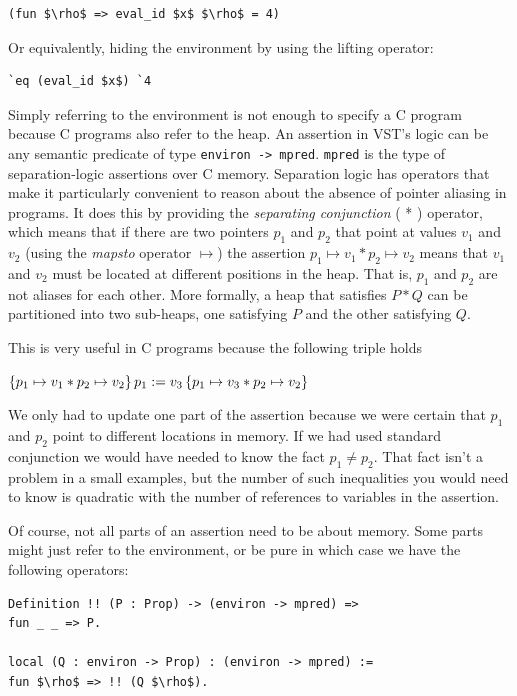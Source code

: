 \documentclass{puthesis}
\begin{document}
\begin{lstlisting}
(fun $\rho$ => eval_id $x$ $\rho$ = 4)
\end{lstlisting}

Or equivalently, hiding the environment by using the lifting operator:

\begin{lstlisting}
`eq (eval_id $x$) `4
\end{lstlisting}

Simply referring to the environment is not enough to specify a C
program because C programs also refer to the heap. An assertion in
VST's logic can be any semantic predicate of type 
\lstinline|environ -> mpred|.  \lstinline|mpred| is the type of separation-logic
assertions over C memory. Separation logic has operators that make it
particularly convenient to reason about the absence of pointer
aliasing in programs. It does this by providing the 
\emph{separating conjunction} ( * ) operator, which means that if there are two
pointers $p_1$ and $p_2$ that point at values $v_1$ and $v_2$ (using
the \emph{mapsto} operator $\mapsto$) the assertion
$p_1 \mapsto v_1 * p_2 \mapsto v_2$ means that $v_1$ and $v_2$ must be
located at different positions in the heap. That is,
$p_1$ and $p_2$ are not aliases for each other. More
formally, a heap that satisfies $P * Q$ can be partitioned into two
sub-heaps, one satisfying $P$ and the other satisfying $Q$.

This is very useful in C programs because the following triple holds

$\{p_1 \mapsto v_1 * p_2 \mapsto v_2\}\,p_1 := v_3\,\{p_1 \mapsto v_3 * p_2 \mapsto v_2\}$

We only had to update one part of the assertion because we were
certain that $p_1$ and $p_2$ point to different locations in memory. If
we had used standard conjunction we would have needed to know the fact
$p_1 \neq p_2$. That fact isn't a problem in a small examples, but the
number of such inequalities you would need to know is quadratic with
the number of references to variables in the assertion. 

Of course, not all parts of an assertion need to be about memory. Some
parts might just refer to the environment, or be pure in which case we
have the following operators:

\begin{lstlisting}
Definition !! (P : Prop) -> (environ -> mpred) => 
fun _ _ => P.

local (Q : environ -> Prop) : (environ -> mpred) :=
fun $\rho$ => !! (Q $\rho$).
\end{lstlisting}
\end{document}
